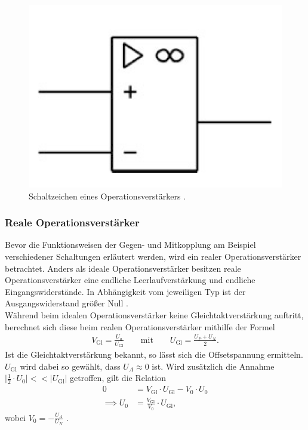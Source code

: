 \begin{figure}
  \centering
  \includegraphics[scale=0.5]{ressources/figure_02.png}
  \caption{Schaltzeichen eines Operationsverstärkers \cite{federau}.}
  \label{fig:02}
\end{figure}
\subsubsection{Reale Operationsverstärker}
\noindent Bevor die Funktionsweisen der Gegen- und Mitkopplung am Beispiel
verschiedener Schaltungen erläutert werden, wird ein realer Operationsverstärker
betrachtet. Anders als ideale Operationsverstärker besitzen reale
Operationsverstärker eine endliche Leerlaufverstärkung und endliche
Eingangswiderstände. In Abhängigkeit vom jeweiligen Typ ist der Ausgangswiderstand
größer Null \cite{federau}.\\
\noindent Während beim idealen Operationsverstärker keine Gleichtaktverstärkung
auftritt, berechnet sich diese beim realen Operationsverstärker mithilfe der
Formel
\begin{align}
  V_\text{Gl} = \frac{U_a}{U_\text{Gl}} \qquad \text{mit} \qquad U_\text{Gl} = \frac{U_P + U_N}{2}.
  \label{eqn:03}
\end{align}
\noindent Ist die Gleichtaktverstärkung bekannt, so lässt sich die Offsetspannung
ermitteln. $U_\text{Gl}$ wird dabei so gewählt, dass $U_A \approx 0$ ist. Wird
zusätzlich die Annahme $\bigr| \frac{1}{2} \cdot U_0 \bigr| << \bigr| U_\text{Gl} \bigr|$
getroffen, gilt die Relation
\begin{align}
  0 &= V_\text{Gl} \cdot U_\text{Gl} - V_0 \cdot U_0 \\
  \implies U_0 &= \frac{V_\text{Gl}}{V_0} \cdot U_\text{Gl},
  \label{eqn:04}
\end{align}
\noindent wobei $V_0 = - \frac{U_A}{U_N}$ \cite{muenster}.
